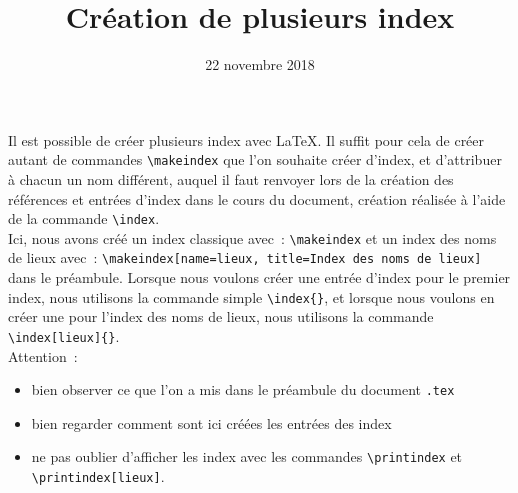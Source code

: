 \documentclass[a4paper,12pt,twoside]{article}
\title{Création de plusieurs index}
\date{22 novembre 2018}
\begin{document}
	
\maketitle

	
	Il est possible de créer plusieurs index avec \LaTeX. Il suffit pour cela de créer autant de commandes \texttt{\textbackslash makeindex} que l'on souhaite créer d'index, et d'attribuer à chacun un nom différent, auquel il faut renvoyer lors de la création des références et entrées d'index dans le cours du document, création réalisée à l'aide de la commande \texttt{\textbackslash{}index}.\\
	
	Ici, nous avons créé un index classique avec~: \texttt{\textbackslash makeindex} et un index des noms de lieux avec~: \texttt{\textbackslash makeindex[name=lieux, title=Index des noms de lieux]} dans le préambule. Lorsque nous voulons créer une entrée d'index pour le premier index, nous utilisons la commande simple \texttt{\textbackslash index\{\}}, et lorsque nous voulons en créer une pour l'index des noms de lieux, nous utilisons la commande \texttt{\textbackslash index[lieux]\{\}}.\\
	
	Attention~:
	\begin{itemize}
		\item bien observer ce que l'on a mis dans le préambule %
		du document \texttt{.tex}
		\item bien regarder comment sont ici créées les entrées des index %
		\item ne pas oublier d'afficher les index avec les commandes \texttt{\textbackslash printindex} et \texttt{\textbackslash printindex[lieux]}.
	\end{itemize}
	
	\printindex
	\printindex[lieux]
	
\end{document}
